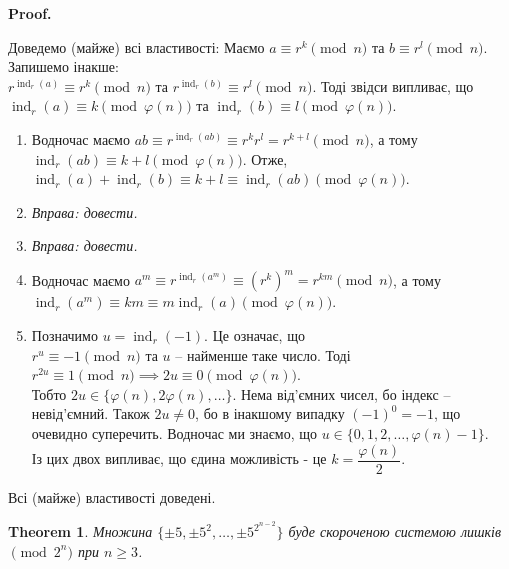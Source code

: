 \documentclass[a4paper, 14pt]{extarticle}
\makeatletter
\theoremstyle{theoremdd}
\newtheorem{theorem}{Theorem}[subsection]
\theoremstyle{theoremdd}
\theoremstyle{theoremdd}
\theoremstyle{theoremdd}
\theoremstyle{theoremdd}
\theoremstyle{theoremdd}
\theoremstyle{theoremdd}
\theoremstyle{theoremdd}
\def\qed{$\blacksquare$}
\renewenvironment{proof}[1][Proof.\\]{\par
\pushQED{\hfill \qed}%
\normalfont \topsep6\p@\@plus6\p@\relax
\trivlist
\item\relax
{\bfseries
#1\@addpunct{.}}\hspace\labelsep\ignorespaces
}{%
\popQED\endtrivlist\@endpefalse
}
\DeclareMathOperator{\ind}{ind}
\makeatother
\begin{document}
\begin{proof}
Доведемо (майже) всі властивості:
Маємо $a \equiv r^k \pmod n$ та $b \equiv r^l \pmod n$. Запишемо інакше:\\
$r^{\ind_r(a)} \equiv r^k \pmod n$ та $r^{\ind_r(b)} \equiv r^l \pmod n$. Тоді звідси випливає, що\\
$\ind_r(a) \equiv k \pmod {\varphi(n)}$ та $\ind_r(b) \equiv l \pmod {\varphi(n)}$.
\begin{enumerate}[wide=0pt,label={\arabic*)}]
\item Водночас маємо $ab \equiv r^{\ind_r(ab)} \equiv r^k r^l = r^{k+l} \pmod n$, а тому \\ $\ind_r(ab) \equiv k+l \pmod {\varphi(n)}$. Отже,\\
$\ind_r(a) + \ind_r(b) \equiv k+l \equiv \ind_r(ab) \pmod {\varphi(n)}$.

\item \textit{Вправа: довести.} \item \textit{Вправа: довести.}

\item Водночас маємо $a^m \equiv r^{\ind_r(a^m)} \equiv (r^k)^m = r^{km} \pmod n$, а тому \\
$\ind_r(a^m) \equiv km \equiv m \ind_r(a) \pmod {\varphi(n)}$.

\item Позначимо $u = \ind_r(-1)$. Це означає, що \\
$r^u \equiv -1 \pmod n$ та $u$ -- найменше таке число. Тоді\\
$r^{2u} \equiv 1 \pmod n \implies 2u \equiv 0 \pmod {\varphi(n)}$.\\
Тобто $2u \in \{\varphi(n),2\varphi(n),\dots\}$. Нема від'ємних чисел, бо індекс -- невід'ємний. Також $2u \neq 0$, бо в інакшому випадку $(-1)^0 = -1$, що очевидно суперечить. Водночас ми знаємо, що $u \in \{0,1,2,\dots,\varphi(n)-1\}$.\\
Із цих двох випливає, що єдина можливість - це $k = \dfrac{\varphi(n)}{2}$.
\end{enumerate}
Всі (майже) властивості доведені.
\end{proof}

\begin{theorem}
Множина $\{\pm 5, \pm 5^2, \dots, \pm 5^{2^{n-2}}\}$ буде скороченою системою лишків $\!\! \pmod {2^n}$ при $n \geq 3$.
\end{theorem}
\end{document}
